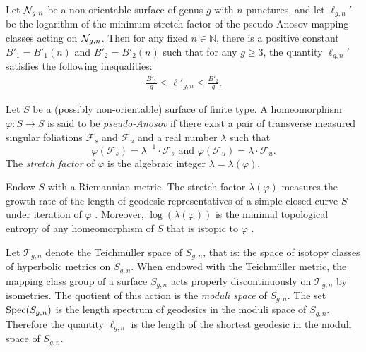 \begin{thm}\label{thm:stretch1}
  Let $\mathcal{N}_{g,n}$ be a non-orientable surface of genus $g$ with $n$ punctures, and let $\ell_{g,n}'$ be the logarithm of
  the minimum stretch factor of the pseudo-Anosov mapping classes acting on $\mathcal{N}_{g,n}$.
  Then for any fixed $n \in \mathbb{N}$, there is a positive constant $B'_1 = B'_1(n)$ and $B'_2 = B'_2(n)$ such
  that for any $g \geq 3$,
  the quantity $\ell_{g,n}'$ satisfies the following inequalities:
  \begin{align*}
    \frac{B'_1}{g} \leq \ell'_{g,n} \leq \frac{B'_2}{g}.
  \end{align*}
\end{thm}


 Let $S$ be a (possibly non-orientable) surface of finite type.  A homeomorphism $\varphi:S\rightarrow S$ is said to be {\it pseudo-Anosov} if there exist a pair of transverse measured singular foliations $\mathcal{F}_s$ and $\mathcal{F}_u$ and a real number $\lambda$ such that $$\varphi(\mathcal{F}_s)=\lambda^{-1} \cdot \mathcal{F}_s\text{ and } \varphi(\mathcal{F}_u)=\lambda \cdot \mathcal{F}_u.$$  The {\it stretch factor} of $\varphi$ is the algebraic integer $\lambda=\lambda(\varphi)$.

Endow $S$ with a Riemannian metric.  The stretch factor $\lambda(\varphi)$ measures the growth rate of the length of geodesic representatives of a simple closed curve $S$ under iteration of $\varphi$ \cite[Proposition 9.21]{FLP}.  Moreover, $\log(\lambda(\varphi))$ is the minimal topological entropy of any homeomorphism of $S$ that is istopic to $\varphi$ \cite[Expos\'e 10]{FLP}.


Let $\mathcal{T}_{g,n}$ denote the Teichm\"uller space of $S_{g,n}$, that is: the space of isotopy classes of hyperbolic metrics on $S_{g,n}$.
When endowed with the Teichm\"uller metric, the mapping class group of a surface $S_{g,n}$ acts properly discontinuously on $\mathcal{T}_{g,n}$ by isometries.  The quotient of this action is the {\it moduli space} of $S_{g,n}$. The set
$\operatorname{Spec}(S_{g,n})$ is the length spectrum of geodesics in the moduli space of $S_{g,n}$.  Therefore the quantity $\ell_{g,n}$ is the length of the shortest geodesic in the moduli space of $S_{g,n}$.

